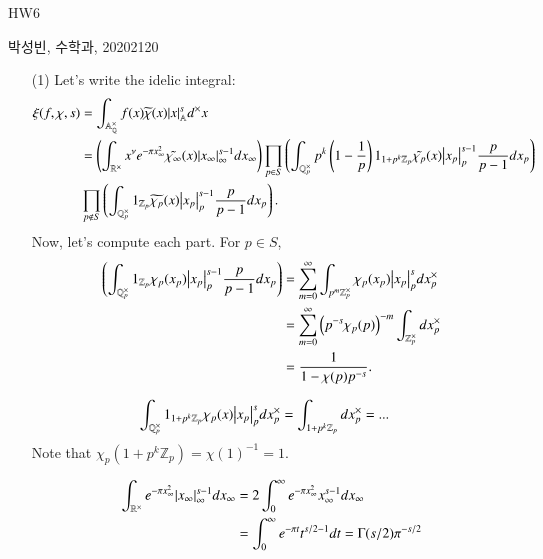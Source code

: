 \documentclass[a4paper, 12pt]{article}
\theoremstyle{Mydefinition}
\theoremstyle{Mytheorem}
\begin{document}
\thispagestyle{myfirstpage}
\begin{center}
	\Large{HW6}
\end{center}
박성빈, 수학과, 20202120

\begin{enumerate}
    \item[(1)] Let's write the idelic integral:
    \begin{equation}
    \begin{split}
        \xi(f,\chi, s) &= \int_{\mathbb{A}_\mathbb{Q}^\times} f(x)\widetilde{\chi}(x)\abs{x}_{\mathbb{A}}^s d^\times x\\
        &=\left(\int_{\mathbb{R}^\times} x^\nu e^{-\pi x_\infty^2}\tilde{\chi_\infty}(x)\abs{x_\infty}_{\infty}^{s-1} dx_\infty\right)\prod_{p\in S}\left(\int_{\mathbb{Q}_p^\times} p^k\left(1-\frac{1}{p}\right)1_{1+p^k \mathbb{Z}_p}\tilde{\chi_p}(x)\abs{x_p}_{p}^{s-1} \frac{p}{p-1}dx_p\right)\\
        &\prod_{p\not\in S}\left(\int_{\mathbb{Q}_p^\times} 1_{\mathbb{Z}_p}\widetilde{\chi_p}(x)\abs{x_p}_{p}^{s-1} \frac{p}{p-1}dx_p\right).
    \end{split}
    \end{equation}
    Now, let's compute each part. For $p\in S$,
    \begin{equation}
        \begin{split}
        \left(\int_{\mathbb{Q}_p^\times} 1_{\mathbb{Z}_p}\chi_p(x_p)\abs{x_p}_{p}^{s-1} \frac{p}{p-1}dx_p\right) &=\sum_{m=0}^\infty\int_{p^m\mathbb{Z}^\times_p} \chi_p(x_p)\abs{x_p}_{p}^{s} dx^\times_p\\
        &=\sum_{m=0}^\infty \left(p^{-s}\chi_p(p)\right)^{-m}\int_{\mathbb{Z}^\times_p} dx^\times_p\\
        &=\frac{1}{1-\chi(p)p^{-s}}.
        \end{split}
    \end{equation}
    
    \begin{equation}
    \begin{split}
        \int_{\mathbb{Q}_p^\times} 1_{1+p^k \mathbb{Z}_p}\chi_p(x)\abs{x_p}_{p}^{s} dx^\times_p &=\int_{1+p^k \mathbb{Z}_p} dx^\times_p = ...
    \end{split}
    \end{equation}
    Note that $\chi_p(1+p^k\mathbb{Z}_p) = \chi(1)^{-1} = 1$.
    
    \begin{equation}
    \begin{split}
        \int_{\mathbb{R}^\times} e^{-\pi x_\infty^2}\abs{x_\infty}_{\infty}^{s-1} dx_\infty &= 2\int_0^\infty e^{-\pi x_\infty^2} x_\infty^{s-1}dx_\infty\\
        &=\int_0^\infty e^{-\pi t} t^{s/2-1}dt = \Gamma(s/2)\pi^{-s/2}
    \end{split}
    \end{equation}
    

\end{enumerate}
\end{document}
